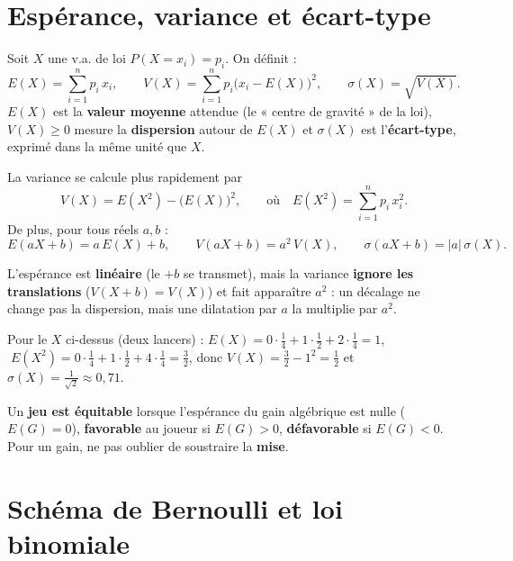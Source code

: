 \section{Espérance, variance et écart-type}

\begin{definition}
Soit $X$ une v.a. de loi $P(X=x_i)=p_i$. On définit :
\[
E(X)=\sum_{i=1}^{n}p_i\,x_i,\qquad
V(X)=\sum_{i=1}^{n}p_i\big(x_i-E(X)\big)^2,\qquad
\sigma(X)=\sqrt{V(X)}.
\]
$E(X)$ est la \textbf{valeur moyenne} attendue (le « centre de gravité » de la
loi), $V(X)\ge0$ mesure la \textbf{dispersion} autour de $E(X)$ et $\sigma(X)$
est l'\textbf{écart-type}, exprimé dans la même unité que $X$.
\end{definition}

\begin{propriete}
La variance se calcule plus rapidement par
\[
V(X)=E(X^2)-\big(E(X)\big)^2,\qquad\text{où}\quad E(X^2)=\sum_{i=1}^{n}p_i\,x_i^{2}.
\]
De plus, pour tous réels $a,b$ :
\[
E(aX+b)=a\,E(X)+b,\qquad V(aX+b)=a^{2}\,V(X),\qquad \sigma(aX+b)=|a|\,\sigma(X).
\]
\end{propriete}

\begin{remarque}
L'espérance est \textbf{linéaire} (le $+b$ se transmet), mais la variance
\textbf{ignore les translations} ($V(X+b)=V(X)$) et fait apparaître $a^2$ : un
décalage ne change pas la dispersion, mais une dilatation par $a$ la multiplie par
$a^2$.
\end{remarque}

\begin{exemple}
Pour le $X$ ci-dessus (deux lancers) :
$E(X)=0\cdot\frac14+1\cdot\frac12+2\cdot\frac14=1$,
$\;E(X^2)=0\cdot\frac14+1\cdot\frac12+4\cdot\frac14=\frac32$,
donc $V(X)=\frac32-1^2=\frac12$ et $\sigma(X)=\frac{1}{\sqrt2}\approx0{,}71$.
\end{exemple}

\begin{aretenir}
Un \textbf{jeu est équitable} lorsque l'espérance du gain algébrique est nulle
($E(G)=0$), \textbf{favorable} au joueur si $E(G)>0$, \textbf{défavorable} si
$E(G)<0$. Pour un gain, ne pas oublier de soustraire la \textbf{mise}.
\end{aretenir}

\section{Schéma de Bernoulli et loi binomiale}

